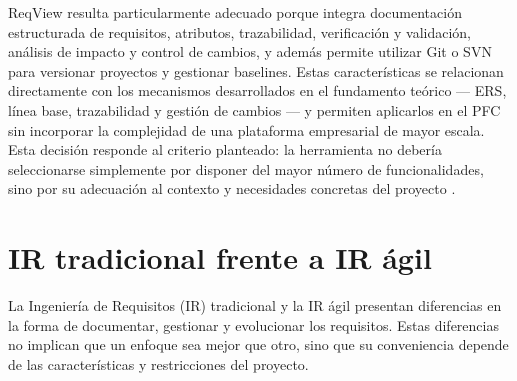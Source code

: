 \documentclass[journal,onecolumn]{IEEEtran}
\begin{document}
	ReqView resulta particularmente adecuado porque integra documentación estructurada de requisitos, atributos, trazabilidad, verificación y validación, análisis de impacto y control de cambios, y además permite utilizar Git o SVN para versionar proyectos y gestionar baselines. Estas características se relacionan directamente con los mecanismos desarrollados en el fundamento teórico --- ERS, línea base, trazabilidad y gestión de cambios --- y permiten aplicarlos en el PFC sin incorporar la complejidad de una plataforma empresarial de mayor escala. Esta decisión responde al criterio planteado: la herramienta no debería seleccionarse simplemente por disponer del mayor número de funcionalidades, sino por su adecuación al contexto y necesidades concretas del proyecto \cite{Bjarnason2023}.
	\section{IR tradicional frente a IR ágil}
	La Ingeniería de Requisitos (IR) tradicional y la IR ágil presentan diferencias en la forma de documentar, gestionar y evolucionar los requisitos. Estas diferencias no implican que un enfoque sea mejor que otro, sino que su conveniencia depende de las características y restricciones del proyecto.
	
\end{document}
